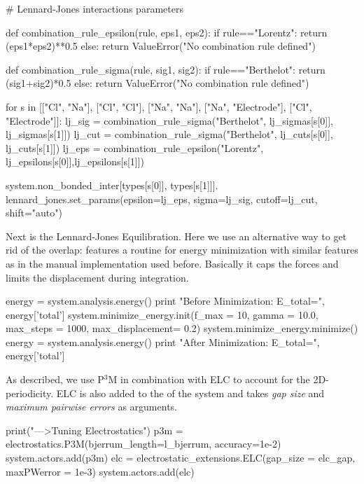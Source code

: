 \documentclass[
a4paper,                        %
11pt,                           %
twoside,                        %
footsepline,                    %
headsepline,                    %
headexclude,                    %
footexclude,                    %
pagesize,                       %
]{scrartcl}
\begin{document}
\begin{pypresso}
# Lennard-Jones interactions parameters 

def combination_rule_epsilon(rule, eps1, eps2):
    if rule=="Lorentz":
        return (eps1*eps2)**0.5
    else:
        return ValueError("No combination rule defined")

def combination_rule_sigma(rule, sig1, sig2):
    if rule=="Berthelot":
        return (sig1+sig2)*0.5
    else:
        return ValueError("No combination rule defined")

for s in [["Cl", "Na"], ["Cl", "Cl"], ["Na", "Na"], ["Na", "Electrode"], ["Cl", "Electrode"]]:
        lj_sig = combination_rule_sigma("Berthelot", 
                lj_sigmas[s[0]], lj_sigmas[s[1]])
        lj_cut = combination_rule_sigma("Berthelot", 
                lj_cuts[s[0]], lj_cuts[s[1]])
        lj_eps = combination_rule_epsilon("Lorentz", 
                lj_epsilons[s[0]],lj_epsilons[s[1]])

        system.non_bonded_inter[types[s[0]], types[s[1]]].
            lennard_jones.set_params(epsilon=lj_eps, 
            sigma=lj_sig, cutoff=lj_cut, shift="auto")
\end{pypresso}

Next is the Lennard-Jones Equilibration. Here we use an alternative way to get rid of the overlap: \es features a routine for energy
minimization with similar features as in the manual implementation used before. Basically it 
caps the forces and limits the displacement during integration.

\begin{pypresso}
energy = system.analysis.energy()
print "Before Minimization: E_total=", energy['total']
system.minimize_energy.init(f_max = 10, gamma = 10.0, 
        max_steps = 1000, max_displacement= 0.2)
system.minimize_energy.minimize()
energy = system.analysis.energy()
print "After Minimization: E_total=", energy['total']
\end{pypresso}

As described, we use P$^3$M in combination with ELC to account for the 2D-periodicity. 
ELC is also added to the  of the system and takes \emph{gap size} and \emph{maximum
pairwise errors} as arguments.

\begin{pypresso}
print("\n--->Tuning Electrostatics")
p3m = electrostatics.P3M(bjerrum_length=l_bjerrum, 
        accuracy=1e-2)
system.actors.add(p3m)
elc = electrostatic_extensions.ELC(gap_size = elc_gap, 
        maxPWerror = 1e-3)
system.actors.add(elc)
\end{pypresso}
\end{document}
